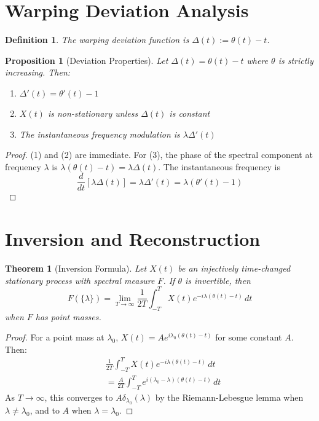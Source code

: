 \documentclass[11pt]{article}
\newtheorem{theorem}{Theorem}
\newtheorem{proposition}{Proposition}
\newtheorem{definition}{Definition}
\begin{document}
\section{Warping Deviation Analysis}

\begin{definition}
The \emph{warping deviation function} is $\Delta(t) := \theta(t) - t$.
\end{definition}

\begin{proposition}[Deviation Properties]
Let $\Delta(t) = \theta(t) - t$ where $\theta$ is strictly increasing. Then:
\begin{enumerate}
\item $\Delta'(t) = \theta'(t) - 1$
\item $X(t)$ is non-stationary unless $\Delta(t)$ is constant
\item The instantaneous frequency modulation is $\lambda \Delta'(t)$
\end{enumerate}
\end{proposition}

\begin{proof}
(1) and (2) are immediate. For (3), the phase of the spectral component at frequency $\lambda$ is $\lambda(\theta(t)-t) = \lambda\Delta(t)$. The instantaneous frequency is
\begin{equation}
\frac{d}{dt}[\lambda\Delta(t)] = \lambda\Delta'(t) = \lambda(\theta'(t)-1)
\end{equation}
\end{proof}

\section{Inversion and Reconstruction}

\begin{theorem}[Inversion Formula]
Let $X(t)$ be an injectively time-changed stationary process with spectral measure $F$. If $\theta$ is invertible, then
\begin{equation}
F(\{\lambda\}) = \lim_{T \to \infty} \frac{1}{2T} \int_{-T}^T X(t) e^{-i\lambda(\theta(t)-t)} \, dt
\end{equation}
when $F$ has point masses.
\end{theorem}

\begin{proof}
For a point mass at $\lambda_0$, $X(t) = A e^{i\lambda_0(\theta(t)-t)}$ for some constant $A$. Then:
\begin{align}
&\frac{1}{2T} \int_{-T}^T X(t) e^{-i\lambda(\theta(t)-t)} \, dt\\
&= \frac{A}{2T} \int_{-T}^T e^{i(\lambda_0-\lambda)(\theta(t)-t)} \, dt
\end{align}
As $T \to \infty$, this converges to $A\delta_{\lambda_0}(\lambda)$ by the Riemann-Lebesgue lemma when $\lambda \neq \lambda_0$, and to $A$ when $\lambda = \lambda_0$.
\end{proof}
\end{document}
